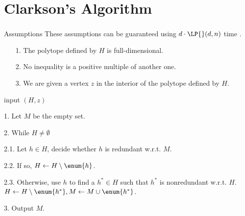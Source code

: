 \section{Clarkson's Algorithm}
\begin{frame}\frametitle{\insertsection}\justifying
\begin{ebox}{Assumptions}
These assumptions can be guaranteed using \(d\cdot\LP{}(d,n)\) time
\cite{fukuda:2015}.
\begin{itemize}
\item[{\color{SpringGreen4}1.}] The polytope defined by \(H\) is full-dimensional.
\item[{\color{SpringGreen4}2.}] No inequality is a positive multiple of another one.
\item[{\color{SpringGreen4}3.}] We are given a vertex \(z\) in the interior of the polytope defined by \(H\).
\end{itemize}
\end{ebox}
\pause
\begin{algo}
\item[input] \((H, z)\)
\item[1.] Let \(M\) be the empty set.
\item[2.] While \(H \neq \emptyset\)
\item[2.1.] Let \(h \in H\), decide whether \(h\) is redundant w.r.t. \(M\).
\item[2.2.] If so, \(H \gets H \setminus \enum{h}\).
\item[2.3.] Otherwise, use \(h\) to find a \(h^* \in H\) such that \(h^*\) is
nonredundant w.r.t. \(H\). \(H \gets H \setminus \enum{h^*}, M
\gets M \cup \enum{h^*}\).
\item[3.] Output \(M\).
\end{algo}
\end{frame}

